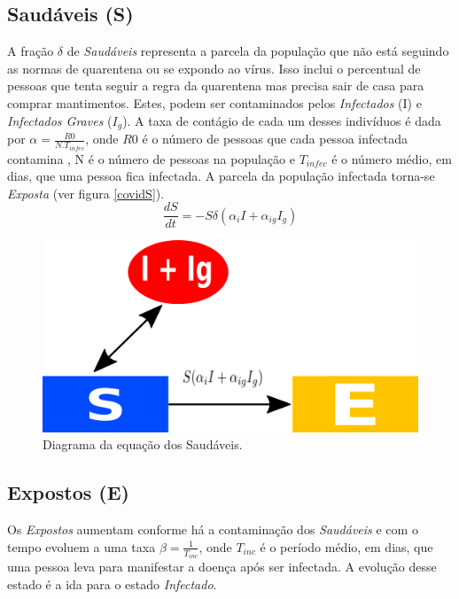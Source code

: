 \documentclass[12pt,a4papper]{article}
\begin{document}
\subsection{Saudáveis (S)}
A fração $\delta$ de \textit{Saudáveis} representa a parcela da população que não está seguindo as normas de quarentena ou se expondo ao vírus. Isso inclui o percentual de pessoas que tenta seguir a regra da quarentena mas precisa sair de casa para comprar mantimentos. Estes, podem ser contaminados pelos \textit{Infectados} (I) e \textit{Infectados Graves} ($I_g$). A taxa de contágio de cada um desses indivíduos é dada por $\alpha=\frac{R0}{N.T_{infec}}$, onde $R0$ é o número de pessoas que cada pessoa infectada contamina \cite{liu2020reproductive}, N é o número de pessoas na população e $T_{infec}$ é o número médio, em dias, que uma pessoa fica infectada. A parcela da população infectada torna-se \textit{Exposta} (ver figura \ref{covidS}). 
\begin{equation}
	\frac{dS}{dt}= -S\delta(\alpha_i I +\alpha_{ig}I_g)
\end{equation}
\begin{figure}[!h]
\label{covidS}
	\centering
	\includegraphics[scale=0.4]{covidS}
	\caption{Diagrama da equação dos Saudáveis.}
	\label{fig:universe}
\end{figure}

\subsection{Expostos (E)}
Os \textit{Expostos} aumentam conforme há a contaminação dos \textit{Saudáveis} e com o tempo evoluem a uma taxa $\beta=\frac{1}{T_{inc}}$, onde $T_{inc}$ é o período médio, em dias, que uma pessoa leva para manifestar a doença após ser infectada.  A evolução desse estado é a ida para o estado \textit{Infectado}.
\end{document}
